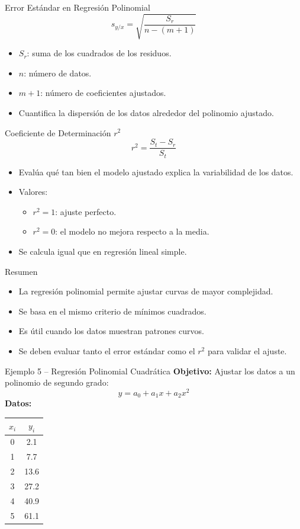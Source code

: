 \documentclass[main.tex]{subfiles}
\begin{document}
\begin{frame}{Error Estándar en Regresión Polinomial}
  \[
    s_{y/x} = \sqrt{ \frac{S_r}{n - (m + 1)} }
  \]
  \begin{itemize}
    \item \(S_r\): suma de los cuadrados de los residuos.
    \item \(n\): número de datos.
    \item \(m + 1\): número de coeficientes ajustados.
    \item Cuantifica la dispersión de los datos alrededor del polinomio ajustado.
  \end{itemize}
\end{frame}

\begin{frame}{Coeficiente de Determinación \(r^2\)}
  \[
    r^2 = \frac{S_t - S_r}{S_t}
  \]
  \begin{itemize}
    \item Evalúa qué tan bien el modelo ajustado explica la variabilidad de los datos.
    \item Valores:
    \begin{itemize}
      \item \(r^2 = 1\): ajuste perfecto.
      \item \(r^2 = 0\): el modelo no mejora respecto a la media.
    \end{itemize}
    \item Se calcula igual que en regresión lineal simple.
  \end{itemize}
\end{frame}

\begin{frame}{Resumen}
  \begin{itemize}
    \item La regresión polinomial permite ajustar curvas de mayor complejidad.
    \item Se basa en el mismo criterio de mínimos cuadrados.
    \item Es útil cuando los datos muestran patrones curvos.
    \item Se deben evaluar tanto el error estándar como el \(r^2\) para validar el ajuste.
  \end{itemize}
\end{frame}

\begin{frame}{Ejemplo 5 – Regresión Polinomial Cuadrática}
  \textbf{Objetivo:} Ajustar los datos a un polinomio de segundo grado:
  \[
  y = a_0 + a_1 x + a_2 x^2
  \]
  \textbf{Datos:}
  \begin{tabular}{cc}
  \hline
  \(x_i\) & \(y_i\) \\
  \hline
  0 & 2.1 \\
  1 & 7.7 \\
  2 & 13.6 \\
  3 & 27.2 \\
  4 & 40.9 \\
  5 & 61.1 \\
  \hline
  \end{tabular}
\end{frame}
\end{document}
